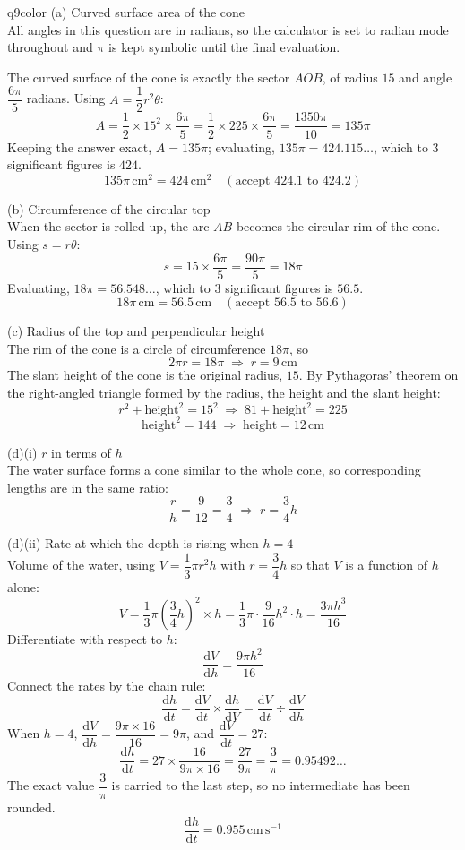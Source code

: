 \documentclass[11pt,a4paper]{article}
\newcommand{\dd}{\mathrm{d}}
\begin{document}
\begin{ansbox}{q9color}
(a) Curved surface area of the cone\\[4pt]
All angles in this question are in radians, so the calculator is set to radian mode throughout and $\pi$ is kept symbolic until the final evaluation.

The curved surface of the cone is exactly the sector $AOB$, of radius $15$ and angle $\dfrac{6\pi}{5}$ radians. Using $A = \dfrac{1}{2}r^2\theta$:
\[
A = \frac{1}{2} \times 15^2 \times \frac{6\pi}{5} = \frac{1}{2} \times 225 \times \frac{6\pi}{5} = \frac{1350\pi}{10} = 135\pi
\]
Keeping the answer exact, $A = 135\pi$; evaluating, $135\pi = 424.115\ldots$, which to 3 significant figures is $424$.
\[
\boxed{135\pi \,\text{cm}^2 = 424 \,\text{cm}^2} \quad (\text{accept } 424.1 \text{ to } 424.2)
\]

(b) Circumference of the circular top\\[4pt]
When the sector is rolled up, the arc $AB$ becomes the circular rim of the cone. Using $s = r\theta$:
\[
s = 15 \times \frac{6\pi}{5} = \frac{90\pi}{5} = 18\pi
\]
Evaluating, $18\pi = 56.548\ldots$, which to 3 significant figures is $56.5$.
\[
\boxed{18\pi \,\text{cm} = 56.5 \,\text{cm}} \quad (\text{accept } 56.5 \text{ to } 56.6)
\]

(c) Radius of the top and perpendicular height\\[4pt]
The rim of the cone is a circle of circumference $18\pi$, so
\[
2\pi r = 18\pi \;\Rightarrow\; \boxed{r = 9 \,\text{cm}}
\]
The slant height of the cone is the original radius, $15$. By Pythagoras' theorem on the right-angled triangle formed by the radius, the height and the slant height:
\[
r^2 + \text{height}^2 = 15^2 \;\Rightarrow\; 81 + \text{height}^2 = 225
\]
\[
\text{height}^2 = 144 \;\Rightarrow\; \boxed{\text{height} = 12 \,\text{cm}}
\]

(d)(i) $r$ in terms of $h$\\[4pt]
The water surface forms a cone similar to the whole cone, so corresponding lengths are in the same ratio:
\[
\frac{r}{h} = \frac{9}{12} = \frac{3}{4} \;\Rightarrow\; \boxed{r = \frac{3}{4}h}
\]

(d)(ii) Rate at which the depth is rising when $h = 4$\\[4pt]
Volume of the water, using $V = \dfrac{1}{3}\pi r^2 h$ with $r = \dfrac{3}{4}h$ so that $V$ is a function of $h$ alone:
\[
V = \frac{1}{3}\pi\left(\frac{3}{4}h\right)^{2} \times h = \frac{1}{3}\pi \cdot \frac{9}{16}h^2 \cdot h = \frac{3\pi h^3}{16}
\]
Differentiate with respect to $h$:
\[
\frac{\dd V}{\dd h} = \frac{9\pi h^2}{16}
\]
Connect the rates by the chain rule:
\[
\frac{\dd h}{\dd t} = \frac{\dd V}{\dd t} \times \frac{\dd h}{\dd V} = \frac{\dd V}{\dd t} \div \frac{\dd V}{\dd h}
\]
When $h = 4$, $\dfrac{\dd V}{\dd h} = \dfrac{9\pi \times 16}{16} = 9\pi$, and $\dfrac{\dd V}{\dd t} = 27$:
\[
\frac{\dd h}{\dd t} = 27 \times \frac{16}{9\pi \times 16} = \frac{27}{9\pi} = \frac{3}{\pi} = 0.95492\ldots
\]
The exact value $\dfrac{3}{\pi}$ is carried to the last step, so no intermediate has been rounded.
\[
\boxed{\frac{\dd h}{\dd t} = 0.955 \,\text{cm}\,\text{s}^{-1}}
\]
\end{ansbox}
\end{document}
